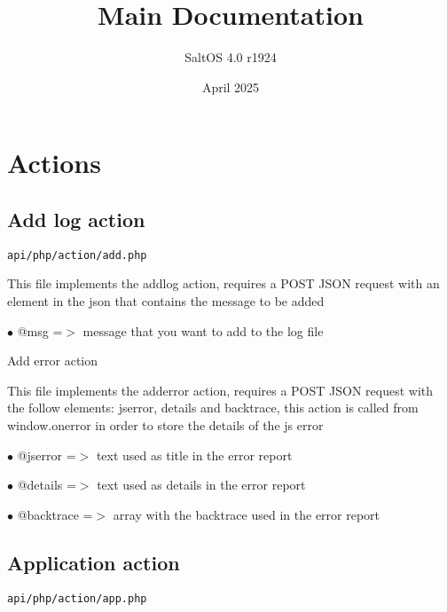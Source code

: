 \documentclass[a4paper]{article}
\title{Main Documentation}
\author{SaltOS 4.0 r1924}
\begin{document}
\date{April 2025}
\maketitle
\clearpage

\tableofcontents
\clearpage


\hypertarget{toc1}{}
\section{Actions}

\hypertarget{toc2}{}
\subsection{Add log action}

\begin{lstlisting}
api/php/action/add.php
\end{lstlisting}

This file implements the addlog action, requires a POST JSON request
with an element in the json that contains the message to be added

\begin{compactitem}
\item[\color{myblue}$\bullet$] @msg =$>$ message that you want to add to the log file
\end{compactitem}

Add error action

This file implements the adderror action, requires a POST JSON request
with the follow elements: jserror, details and backtrace, this action
is called from window.onerror in order to store the details of the js
error

\begin{compactitem}
\item[\color{myblue}$\bullet$] @jserror   =$>$ text used as title in the error report
\item[\color{myblue}$\bullet$] @details   =$>$ text used as details in the error report
\item[\color{myblue}$\bullet$] @backtrace =$>$ array with the backtrace used in the error report
\end{compactitem}

\hypertarget{toc3}{}
\subsection{Application action}

\begin{lstlisting}
api/php/action/app.php
\end{lstlisting}
\end{document}
